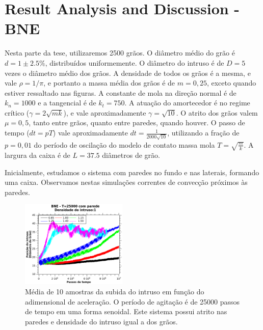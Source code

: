 
\chapter{Result Analysis and Discussion - BNE}
\label{chap:Resultados-BNE}




    Nesta parte da tese, utilizaremos 2500 grãos. O diâmetro médio do grão é $d = 1\pm 2.5\%$, distribuídos uniformemente. O diâmetro do intruso é de $D = 5$ vezes o diâmetro médio dos grãos. A densidade de todos os grãos é a mesma, e vale $\rho = 1/\pi$, e portanto a massa média dos grãos é de $m = 0,25$, exceto quando estiver ressaltado nas figuras. A constante de mola na direção normal é de $k_{n} = 1000$ e a tangencial é de $k_{t} = 750$. A atuação do amortecedor é no regime crítico ($\gamma = 2\sqrt{m k}$), e vale aproximadamente $\gamma = \sqrt{10}$. O atrito dos grãos valem $\mu = 0,5$, tanto entre grãos, quanto entre paredes, quando houver. O passo de tempo ($dt=pT$) vale aproximadamente $dt = \frac{1}{2000\sqrt{10}}$, utilizando a fração de $p=0,01$ do período de oscilação do modelo de contato massa mola $T = \sqrt{\frac{m}{k}}$. A largura da caixa é de $L = 37.5$ diâmetros de grão.

    Inicialmente, estudamos o sistema com paredes no fundo e nas laterais, formando uma caixa. Observamos nestas simulações correntes de convecção próximos às paredes.

\begin{figure}
    \centering
    \includegraphics[width=0.45\textwidth]{04-figuras/BNE25000D1.png}
    \caption{Média de 10 amostras da subida do intruso em função do adimensional de aceleração. O período de agitação é de 25000 passos de tempo em uma forma senoidal. Este sistema possui atrito nas paredes e densidade do intruso igual a dos grãos.}
    \label{fig:BNE25000_Parede}
\end{figure}

